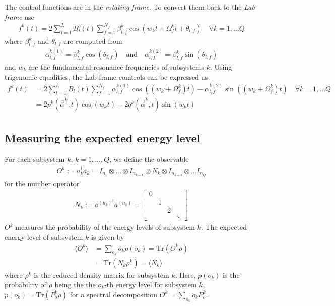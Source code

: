 \documentclass[letterpaper]{article}
\begin{document}
The control functions are in the \textit{rotating frame}. To convert them back to the \textit{Lab frame} use
\begin{align}
  f^k(t) = 2 \sum_{l=1}^L B_l(t) \sum_{f=1}^{N_f} \beta_{l,f}^k \cos(w_k t + \Omega_f^k t + \theta_{l,f}) \quad \forall k=1,\dots Q
\end{align}
where $\beta_{l,f}^k$ and $\theta_{l,f}$ are computed from
\begin{align}
  \alpha_{l,f}^{k(1)} = \beta_{l,f}^k \cos(\theta_{l,f}) \quad \text{and} \quad \alpha_{l,f}^{k(2)} = \beta_{l,f}^k \sin(\theta_{l,f})
\end{align}
and $w_k$ are the fundamental resonance frequencies of subsystems $k$. Using trigenomic equalities, the Lab-frame comtrols can be expressed as
\begin{align}
  f^k(t) &= 2 \sum_{l=1}^L B_l(t) \sum_{f=1}^{N_f} \alpha_{l,f}^{k(1)} \cos((w_k + \Omega_f^k) t) - \alpha_{l,f}^{k(2)}\sin((w_k + \Omega_f^k) t) \quad \forall k=1,\dots Q \\
         &= 2 p^k(\vec{\alpha}^k, t) \cos(w_k t) - 2 q^k(\vec{\alpha}^k, t)\sin(w_k t) \\
\end{align}


\subsection{Measuring the expected energy level}\label{sec:expectedenergy}
For each subsystem $k$, $k=1,\dots, Q$, we define the observable 
\begin{align}
  O^k := a_k^\dag a_k  = I_{n_1} \otimes \dots \otimes I_{n_{k-1}} \otimes  N_k \otimes I_{n_{k+1}} \otimes \dots I_{n_Q} 
\end{align}
for the number operator 
\begin{align}
  N_k := a^{(n_k)^\dag} a^{(n_k)} = \begin{bmatrix} 
   0 &    &    & \\
     &  1 &    &\\
     &    &  2 &\\
     &    &    & \ddots 
  \end{bmatrix}
\end{align}
$O^k$ measures the probability of the energy levels of subsystem $k$. The expected energy level of subsystem $k$ is given by 
\begin{align}
  \langle O^k \rangle &= \sum_{o_k} o_k p(o_k)  = \mbox{Tr}(O^k\rho) \\
   & = \mbox{Tr}(N_k \rho^k)  = \langle N_k\rangle
\end{align}
where $\rho^k$ is the reduced density matrix for subsystem $k$. Here, $p(o_k)$ is the probability of $\rho$ being the the $o_k$-th energy level for subsystem $k$, $p(o_k) = \mbox{Tr}(P^k_o \rho)$ for a spectral decomposition $O^k = \sum_{o_k} o_kP^k_o$. 
\end{document}
